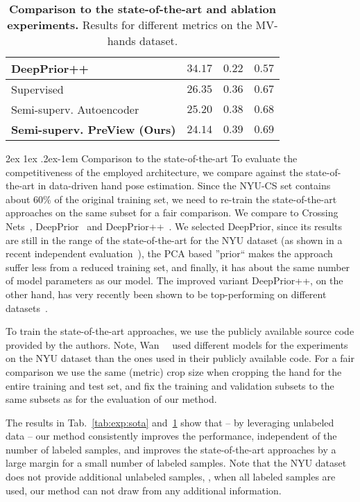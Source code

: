 \documentclass[10pt,twocolumn,letterpaper]{article}
\makeatletter
\renewcommand{\paragraph}{%
  \@startsection{paragraph}{4}%
  {\z@}{2ex \@plus 1ex \@minus .2ex}{-1em}%
  {\normalfont\normalsize\bfseries}%
}
\makeatother
\begin{document}
\begin{table}[t]
\begin{center}
\begin{tabular}{l c c c}
\midrule
DeepPrior++~\cite{Oberweger2017iccvw_deeppriorpp} & $34.17$ & $0.22$ & $0.57$ \\ 
\midrule
Supervised & $26.35$ & $0.36$ & $0.67$ \\ 
Semi-superv. Autoencoder & $25.20$ & $0.38$ & $0.68$ \\ 
\textbf{Semi-superv. PreView (Ours)} & $\mathbf{24.14}$ & $\mathbf{0.39}$ & $\mathbf{0.69}$ \\
\bottomrule
\end{tabular}
\end{center}
\caption{\textbf{Comparison to the state-of-the-art and ablation experiments.}
  Results for different metrics on the MV-hands dataset.
  }
\label{tab:exp:semisupervised:ablation:icg:289}
\end{table}\paragraph{Comparison to the state-of-the-art}
To evaluate the competitiveness of the employed architecture, 
we compare against the state-of-the-art in data-driven hand pose estimation.
Since the NYU-CS set contains about 60\% of the original training set,
we need to re-train the state-of-the-art approaches on the same subset for a fair comparison.
We compare to Crossing Nets~\cite{Wan2017cvpr_crossingnets}, 
DeepPrior~\cite{Oberweger2015cvww_deepprior} and 
DeepPrior++~\cite{Oberweger2017iccvw_deeppriorpp}.
We selected DeepPrior, since its 
results are still in the range of the state-of-the-art
for the NYU dataset 
(as shown in a recent independent evaluation~\cite{Yuan2017cvpr_bighand}),
the PCA based ''prior`` makes the approach suffer less 
from a reduced training set, and finally,
it has about the same number of model parameters as our model.
The improved variant DeepPrior++, on the other hand, 
has very recently been shown to be top-performing 
on different datasets~\cite{Oberweger2017iccvw_deeppriorpp}.

To train the state-of-the-art approaches, we use the publicly available 
source code provided by the authors.
Note, Wan~\etal~\cite{Wan2017cvpr_crossingnets} used
different models for the experiments on the NYU dataset 
than the ones used in their publicly available code.
For a fair comparison we use the same (metric) crop size 
when cropping the hand for the entire training and test set, and
fix the training and validation subsets to the same subsets as for the evaluation 
of our method.

The results in Tab.~\ref{tab:exp:sota} and~\ref{tab:exp:semisupervised:ablation:icg:289}
show that -- by leveraging unlabeled data -- 
our method consistently improves the performance, independent of the number of labeled samples,
and improves the state-of-the-art approaches by a large margin 
for a small number of labeled samples.
Note that the NYU dataset does not provide additional unlabeled samples, \ie,
when all labeled samples are used, our method can not draw from any additional 
information.
\end{document}
